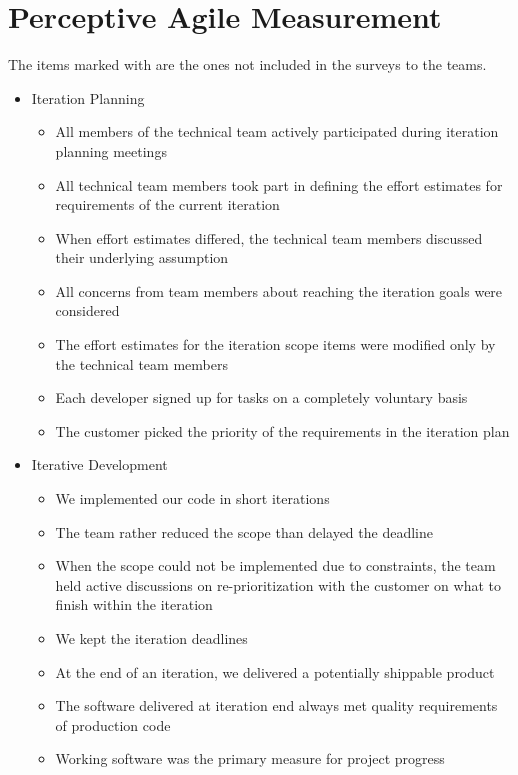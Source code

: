 \chapter{Perceptive Agile Measurement}  %
\label{sec:pam}

The items marked with \XSolidBrush  are the ones not included in the surveys to the teams.

\begin{itemize}
	\item Iteration Planning
		\begin{itemize}
			\item All members of the technical team actively participated during iteration planning meetings
			\item All technical team members took part in defining the effort estimates for requirements of the current iteration
   			\item When effort estimates differed, the technical team members discussed their underlying assumption
   			\item All concerns from team members about reaching the iteration goals were considered
   			\item The effort estimates for the iteration scope items were modified only by the technical team members
   			\item Each developer signed up for tasks on a completely voluntary basis
   			\item The customer picked the priority of the requirements in the iteration plan
		\end{itemize}
	\item Iterative Development
		\begin{itemize}
			\item We implemented our code in short iterations
			\item The team rather reduced the scope than delayed the deadline
			\item When the scope could not be implemented due to constraints, the team held active discussions on re-prioritization with the customer on what to finish within the iteration
			\item We kept the iteration deadlines
			\item At the end of an iteration, we delivered a potentially shippable product
			\item The software delivered at iteration end always met quality requirements of production code
			\item Working software was the primary measure for project progress

\end{itemize}
\end{itemize}
